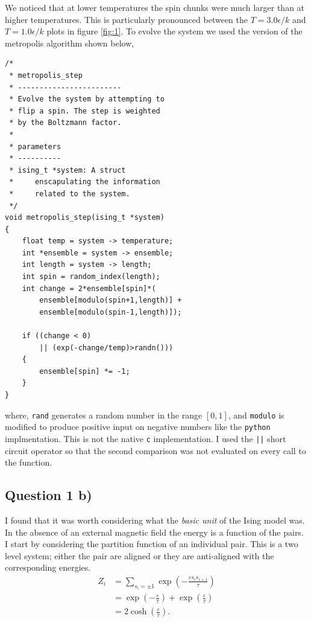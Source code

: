 \documentclass[a4paper, twocolumn]{article}
\begin{document}
We noticed that at lower temperatures the spin chunks were %
much larger than at higher temperatures. This is particularly %
pronounced between the \(T = 3.0\epsilon/k\) and \(T = %
1.0\epsilon/k\) plots in figure \ref{fig:1}. To evolve the %
system we used the version of the metropolis algorithm %
shown below, 

\begin{lstlisting}
/*
 * metropolis_step
 * ------------------------ 
 * Evolve the system by attempting to 
 * flip a spin. The step is weighted 
 * by the Boltzmann factor.
 *
 * parameters
 * ----------
 * ising_t *system: A struct 
 *     enscapulating the information 
 *     related to the system. 
 */
void metropolis_step(ising_t *system)
{
    float temp = system -> temperature;
    int *ensemble = system -> ensemble;
    int length = system -> length;
    int spin = random_index(length);
    int change = 2*ensemble[spin]*(
        ensemble[modulo(spin+1,length)] +
        ensemble[modulo(spin-1,length)]);

    if ((change < 0)
        || (exp(-change/temp)>randn()))
    {
        ensemble[spin] *= -1;
    }
}
\end{lstlisting}

where, \verb!rand! generates a random number in the range %
\([0, 1]\), and \verb!modulo! is modified to produce %
positive input on negative numbers like the \verb!python! %
implmentation. This is not the native \verb!c! implementation. %
I used the \verb!||! short circuit operator so that %
the second comparison was not evaluated on every call %
to the function. 
            

\subsection*{Question 1 b)}
I found that it was worth considering what the \emph{basic %
unit} of the Ising model was. In the absence of an external %
magnetic field the energy is a function of the pairs. I start %
by considering the partition function of an individual pair. %
This is a two level system; either the pair are aligned or they %
are anti-aligned with the corresponding energies.
%
\begin{align}
    Z_{i} &= \sum_{s_{i} = \pm 1}
            \exp\left(-\frac{\varepsilon s_{i}s_{i+1}}{\tau}\right)
            \nonumber\\
        &= \exp\left(-\frac{\varepsilon}{\tau}\right) +
            \exp\left(\frac{\varepsilon}{\tau}\right)
            \nonumber\\
        &= 2\cosh\left(\frac{\varepsilon}{\tau}\right).
    \label{eqn:1}
\end{align}
\end{document}
